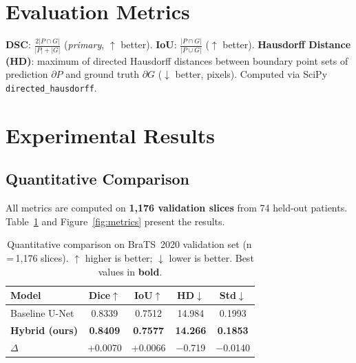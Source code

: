 \documentclass[10pt,twocolumn]{article}
\begin{document}
\section{Evaluation Metrics}

\textbf{DSC}: $\frac{2|P\cap G|}{|P|+|G|}$ (\textit{primary}, $\uparrow$ better).
\textbf{IoU}: $\frac{|P\cap G|}{|P\cup G|}$ ($\uparrow$ better).
\textbf{Hausdorff Distance (HD)}: maximum of directed Hausdorff distances between
boundary point sets of prediction $\partial P$ and ground truth $\partial G$
($\downarrow$ better, pixels). Computed via SciPy \texttt{directed\_hausdorff}.

\section{Experimental Results}

\subsection{Quantitative Comparison}

All metrics are computed on \textbf{1{,}176 validation slices} from 74 held-out
patients. Table~\ref{tab:results} and Figure~\ref{fig:metrics} present the results.

\begin{table}[H]
  \centering
  \caption{Quantitative comparison on BraTS~2020 validation set (n\,=\,1{,}176
           slices). $\uparrow$ higher is better; $\downarrow$ lower is better.
           Best values in \textbf{bold}.}
  \label{tab:results}
  \renewcommand{\arraystretch}{1.3}
  \begin{tabular}{@{}lcccc@{}}
    \toprule
    \textbf{Model} & \textbf{Dice}$\uparrow$ & \textbf{IoU}$\uparrow$
                   & \textbf{HD}$\downarrow$ & \textbf{Std}$\downarrow$ \\
    \midrule
    Baseline U-Net & 0.8339 & 0.7512 & 14.984 & 0.1993 \\
    \textbf{Hybrid (ours)} & \textbf{0.8409} & \textbf{0.7577}
                           & \textbf{14.266} & \textbf{0.1853} \\
    \midrule
    $\Delta$ & \textcolor{mygreen}{+0.0070} & \textcolor{mygreen}{+0.0066}
             & \textcolor{mygreen}{$-$0.719} & \textcolor{mygreen}{$-$0.0140} \\
    \bottomrule
  \end{tabular}
\end{table}
\end{document}

